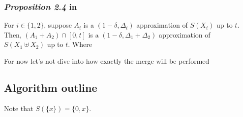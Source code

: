 \subsubsection{\textit{Proposition 2.4} in \cite{deng}} 

For \(i \in \{1, 2\}\), suppose \(A_i\) is a \((1 - \delta, \Delta_i)\) approximation of \(S(X_i)\) up to \(t\). Then, \((A_1 + A_2) \cap [0, t]\) is a \((1 - \delta, \Delta_1 + \Delta_2)\) approximation of \(S(X_1 \uplus X_2)\) up to \(t\). Where 

For now let's not dive into how exactly the merge will be performed 

\subsection{Algorithm outline}
Note that \( S(\{x\}) = \{0, x\}\). 